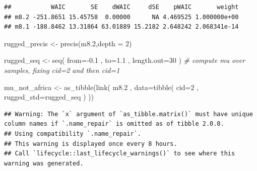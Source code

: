 \documentclass[
]{book}
\newenvironment{Shaded}{\begin{snugshade}}{\end{snugshade}}
\newcommand{\AttributeTok}[1]{\textcolor[rgb]{0.77,0.63,0.00}{#1}}
\newcommand{\CommentTok}[1]{\textcolor[rgb]{0.56,0.35,0.01}{\textit{#1}}}
\newcommand{\DecValTok}[1]{\textcolor[rgb]{0.00,0.00,0.81}{#1}}
\newcommand{\FloatTok}[1]{\textcolor[rgb]{0.00,0.00,0.81}{#1}}
\newcommand{\FunctionTok}[1]{\textcolor[rgb]{0.00,0.00,0.00}{#1}}
\newcommand{\NormalTok}[1]{#1}
\newcommand{\OtherTok}[1]{\textcolor[rgb]{0.56,0.35,0.01}{#1}}
\newcommand{\SpecialCharTok}[1]{\textcolor[rgb]{0.00,0.00,0.00}{#1}}
\begin{document}
\begin{verbatim}
##           WAIC       SE    dWAIC     dSE    pWAIC       weight
## m8.2 -251.8651 15.45758  0.00000      NA 4.469525 1.000000e+00
## m8.1 -188.8462 13.31864 63.01889 15.2182 2.648242 2.068341e-14
\end{verbatim}

\begin{Shaded}
\begin{Highlighting}[]
\NormalTok{rugged\_precis }\OtherTok{\textless{}{-}} \FunctionTok{precis}\NormalTok{(m8}\FloatTok{.2}\NormalTok{,}\AttributeTok{depth =} \DecValTok{2}\NormalTok{)}



\NormalTok{rugged\_seq }\OtherTok{\textless{}{-}} \FunctionTok{seq}\NormalTok{( }\AttributeTok{from=}\SpecialCharTok{{-}}\FloatTok{0.1}\NormalTok{ , }\AttributeTok{to=}\FloatTok{1.1}\NormalTok{ , }\AttributeTok{length.out=}\DecValTok{30}\NormalTok{ ) }\CommentTok{\# compute mu over samples, fixing cid=2 and then cid=1 }

\NormalTok{mu\_not\_africa }\OtherTok{\textless{}{-}} \FunctionTok{as\_tibble}\NormalTok{(}\FunctionTok{link}\NormalTok{( m8}\FloatTok{.2}\NormalTok{ ,}
\AttributeTok{data=}\FunctionTok{tibble}\NormalTok{( }\AttributeTok{cid=}\DecValTok{2}\NormalTok{ , }\AttributeTok{rugged\_std=}\NormalTok{rugged\_seq ) ))}
\end{Highlighting}
\end{Shaded}

\begin{verbatim}
## Warning: The `x` argument of `as_tibble.matrix()` must have unique column names if `.name_repair` is omitted as of tibble 2.0.0.
## Using compatibility `.name_repair`.
## This warning is displayed once every 8 hours.
## Call `lifecycle::last_lifecycle_warnings()` to see where this warning was generated.
\end{verbatim}
\end{document}

